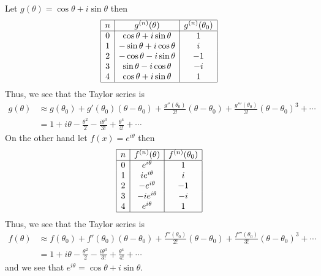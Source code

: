 \documentclass{hwset}
\begin{document}
\begin{solution}
	Let $g(\theta) = \cos \theta + i \sin \theta$ then
	\begin{equation*}
		\begin{array}{|c|c|c|}
			\hline
			n & g^{(n)}(\theta) & g^{(n)}(\theta_0) \\
			\hline
			0 & \cos \theta + i \sin \theta & 1 \\
			1 & -\sin \theta + i \cos \theta & i \\
			2 & -\cos \theta - i \sin \theta & -1 \\
			3 & \sin \theta - i \cos \theta & -i \\
			4 & \cos \theta + i \sin \theta & 1 \\
			\hline
		\end{array}
	\end{equation*}
	Thus, we see that the Taylor series is
	\begin{align*}
		g(\theta) &\approx g(\theta_0) + g'(\theta_0)(\theta - \theta_0) +
			\frac{g''(\theta_0)}{2!}(\theta - \theta_0) +
			\frac{g'''(\theta_0)}{3!}(\theta-\theta_0)^3 + \cdots \\
		&= 1 + i \theta - \frac{\theta^2}{2} - \frac{i\theta^3}{3!} +
			\frac{\theta^4}{4!} + \cdots
	\end{align*}
	On the other hand let $f(x) = e^{i\theta}$ then
	\begin{equation*}
		\begin{array}{|c|c|c|}
			\hline
			n & f^{(n)}(\theta) & f^{(n)}(\theta_0) \\
			\hline
			0 & e^{i\theta} & 1 \\
			1 & ie^{i\theta} & i \\
			2 & -e^{i\theta} & -1 \\
			3 & -ie^{i\theta} & -i \\
			4 & e^{i\theta} & 1 \\
			\hline
		\end{array}
	\end{equation*}
	Thus, we see that the Taylor series is
	\begin{align*}
		f(\theta) &\approx f(\theta_0) + f'(\theta_0)(\theta - \theta_0) +
			\frac{f''(\theta_0)}{2!}(\theta - \theta_0) +
			\frac{f'''(\theta_0)}{3!}(\theta-\theta_0)^3 + \cdots \\
		&= 1 + i \theta - \frac{\theta^2}{2} - \frac{i\theta^3}{3!} +
			\frac{\theta^4}{4!} + \cdots
	\end{align*}
	and we see that $e^{i\theta} = \cos \theta + i \sin \theta$.
\end{solution}
\end{document}
